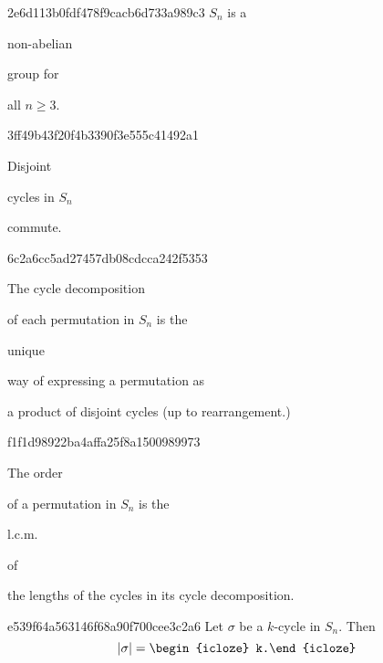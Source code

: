 \begin{note}{2e6d113b0fdf478f9cacb6d733a989c3}
    \({ S_n }\) is a \begin{icloze}{2}non-abelian\end{icloze} group for \begin{icloze}{1}all \({ n \geq 3 }\).\end{icloze}
\end{note}

\begin{note}{3ff49b43f20f4b3390f3e555c41492a1}
    \begin{icloze}{2}Disjoint\end{icloze} cycles in \({ S_n }\) \begin{icloze}{1}commute.\end{icloze}
\end{note}

\begin{note}{6c2a6cc5ad27457db08cdcca242f5353}
    \begin{icloze}{3}The cycle decomposition\end{icloze} of each permutation in \({ S_n }\) is the \begin{icloze}{1}unique\end{icloze} way of expressing a permutation as \begin{icloze}{2}a product of disjoint cycles (up to rearrangement.)\end{icloze}
\end{note}

\begin{note}{f1f1d98922ba4affa25f8a1500989973}
    \begin{icloze}{3}The order\end{icloze} of a permutation in \({ S_n }\) is the \begin{icloze}{2}l.c.m.\ \end{icloze} of \begin{icloze}{1}the lengths of the cycles in its cycle decomposition.\end{icloze}
\end{note}

\begin{note}{e539f64a563146f68a90f700cee3c2a6}
    Let \({ \sigma }\) be a \({ k }\)-cycle in \({ S_n }\).
    Then
    \[
        \left\lvert \sigma \right\rvert = \begin{icloze}{1}k.\end{icloze}
    \]
\end{note}

